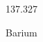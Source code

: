 \documentclass[12pt]{article}
\begin{document}
\hfill{}
\vfill
\begin{center}
  {\fontsize{50}{60}
  }

  \vspace{1em}

  137.327

Barium
\end{center}
\vfill
\end{document}
